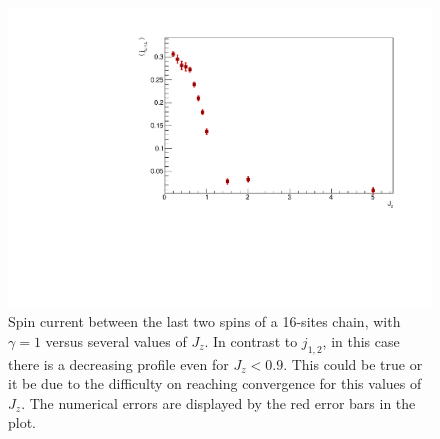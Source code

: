 \begin{figure}[H]
    \centering
    \captionsetup{width=1.\linewidth}
    \includegraphics[scale=0.6]{Figures/SpinCurrVSJzLth.pdf}
    \caption{Spin current between the last two spins of a 16-sites chain, with $\gamma=1$ versus several values of $J_z$. In contrast to $j_{1,2}$, in this case there is a decreasing profile even for $J_z < 0.9$. This could be true or it be due to the difficulty on reaching convergence for this values of $J_z$. The numerical errors are displayed by the red error bars in the plot.}
    \label{fig:SpinCurrVSJzLth}
\end{figure}